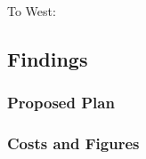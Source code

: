To West:
\begin{center}
\end{center}

\subsection{Findings}
\subsubsection{Proposed Plan}
\subsubsection{Costs and Figures}
